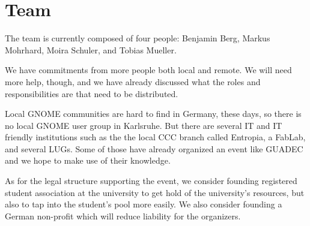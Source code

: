 
\newpage


\vspace*{9.5cm}


\section{Team}

The team is currently composed of four people:
Benjamin Berg, Markus Mohrhard, Moira Schuler, and Tobias Mueller.

We have commitments from more people both local and remote.
We will need more help, though, and we have already discussed
what the roles and responsibilities are that need to be distributed.

Local GNOME communities are hard to find in Germany, these days,
so there is no local GNOME user group in Karlsruhe.
But there are several IT and IT friendly institutions such as the
the local CCC branch called Entropia, a FabLab, and several LUGs.
Some of those have already organized an event like GUADEC and
we hope to make use of their knowledge.

As for the legal structure supporting the event,
we consider founding registered student association at
the university to get hold of the university's resources,
but also to tap into the student's pool more easily.
We also consider founding a German non-profit which will reduce
liability for the organizers.
